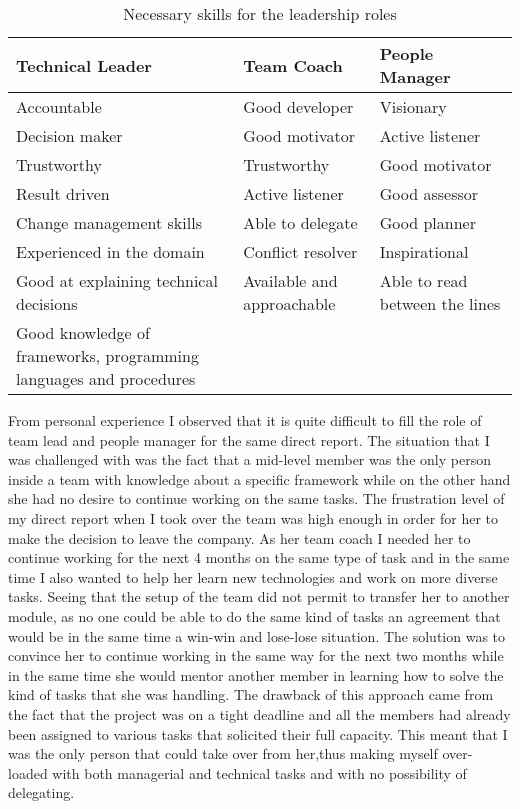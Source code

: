 \begin{table}[htb]
	\centering
	\begin{tabular}{| p{4.2cm} | p{4cm} | p{4.2cm} |}
		\toprule
		 Technical Leader & Team Coach & People Manager \\ \midrule
	    
	    Accountable & Good developer & Visionary\\
	    Decision maker & Good motivator& Active listener \\ 
	     Trustworthy  & Trustworthy & Good motivator \\
	    Result driven & Active listener & Good assessor \\
	    Change management skills&Able to delegate & Good planner \\
	    Experienced in the domain & Conflict resolver & Inspirational \\
	    Good at explaining technical decisions &  Available and approachable & Able to read between the lines \\
	    Good knowledge of frameworks, programming languages and procedures  & & \\
\bottomrule

		\end{tabular}
		\caption{Necessary skills for the leadership roles}
		\label{tab:leader-skills}
\end{table}


From personal experience I observed that it is quite difficult to fill the role of team lead and people manager for the same direct report. The situation that I was challenged with was the fact that a mid-level member was the only person inside a team with knowledge about a specific framework while on the other hand she had no desire to continue working on the same tasks. The frustration level of my direct report when I took over the team was high enough in order for her to make the decision to leave the company. As her team coach I needed her to continue working for the next 4 months on the same type of task and in the same time I also wanted to help her learn new technologies and work on more diverse tasks. Seeing that the setup of the team did not permit to transfer her to another module, as no one could be able to do the same kind of tasks an agreement that would be in the same time a win-win and lose-lose situation. The solution was to convince her to continue working in the same way for the next two months while in the same time she would mentor another member in learning how to solve the kind of tasks that she was handling. The drawback of this approach came from the fact that the project was on a tight deadline and all the members had already been assigned to various tasks that solicited their full capacity. This meant that I was the only person that could take over from her,thus making myself over-loaded with both managerial and technical tasks and with no possibility of delegating.